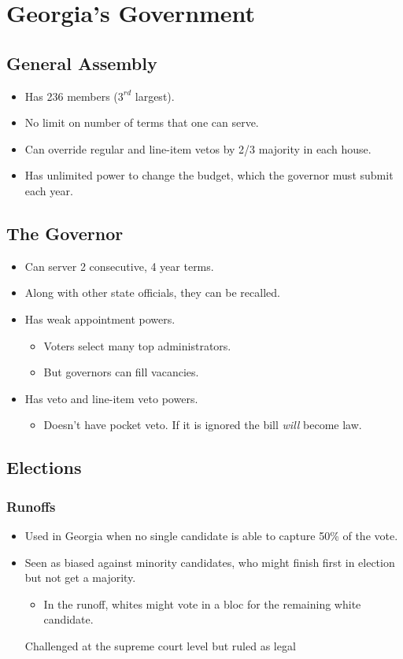 \section{Georgia's Government}
\subsection{General Assembly}
\begin{itemize}
    \item Has 236 members ($3^{rd}$ largest).
    \item No limit on number of terms that one can serve.
    \item Can override regular and line-item vetos by 2/3 majority in each house.
    \item Has unlimited power to change the budget, which the governor must submit each year.
\end{itemize}
\subsection{The Governor}
\begin{itemize}
    \item Can server 2 consecutive, 4 year terms.
    \item Along with other state officials, they can be recalled.
    \item Has weak appointment powers. 
    \begin{itemize}
        \item Voters select many top administrators.
        \item But governors can fill vacancies.
    \end{itemize}
    \item Has veto and line-item veto powers.
    \begin{itemize}
        \item Doesn't have pocket veto. If it is ignored the bill \textit{will} become law.
    \end{itemize}
\end{itemize}
\subsection{Elections}
\subsubsection{Runoffs}
\begin{itemize}
    \item Used in Georgia when no single candidate is able to capture 50\% of the vote.
    \item Seen as biased against minority candidates, who might finish first in election but not get a majority.
    \begin{itemize}
        \item In the runoff, whites might vote in a bloc for the remaining white candidate.
    \end{itemize}
    Challenged at the supreme court level but ruled as legal
\end{itemize}